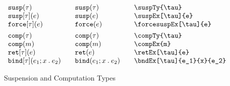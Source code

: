 \documentclass[11pt]{article}
\begin{document}
\begin{figure}

  \begin{small}
    \begin{displaymath}
      \begin{array}{l@{\qquad}l@{\qquad}l@{\qquad}l}
        \suspTy{\tau}           & \suspTy*{\tau}           & \verb|\suspTy{\tau}|           \\
        \suspEx[\tau]{e}        & \suspEx*[\tau]{e}        & \verb|\suspEx[\tau]{e}|        \\
        \forcesuspEx[\tau]{e}   & \forcesuspEx*[\tau]{e}   & \verb|\forcesuspEx[\tau]{e}|   \\[1ex]

        \compTy{\tau}           & \compTy*{\tau}           & \verb|\compTy{\tau}|           \\
        \compEx{m}              & \compEx*{m}              & \verb|\compEx{m}|              \\
        \retEx[\tau]{e}         & \retEx*[\tau]{e}         & \verb|\retEx[\tau]{e}|         \\
        \bndEx[\tau]{e_1}{x}{e_2} & \bndEx*[\tau]{e_1}{x}{e_2} & \verb|\bndEx[\tau]{e_1}{x}{e_2}|
    \end{array}
    \end{displaymath}
  \end{small}

  \caption{Suspension and Computation Types}
  \label{fig:comp-susp}
\end{figure}
\end{document}
